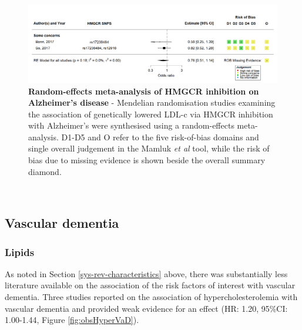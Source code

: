 \documentclass[a4paper, twoside]{templates/ociamthesis}
\begin{document}
\begin{figure}[H]
\includegraphics[width=1\linewidth]{figures/sys-rev/fp_MR_HMGCR_AD} \caption[Random-effects meta-analysis of HMGCR inhibition on Alzheimer's disease]{\textbf{Random-effects meta-analysis of HMGCR inhibition on Alzheimer's disease} - Mendelian randomisation studies examining the association of genetically lowered LDL-c via HMGCR inhibition with Alzheimer's were synthesised using a random-effects meta-analysis. D1-D5 and O refer to the five risk-of-bias domains and single overall judgement in the Mamluk \emph{et al} tool, while the risk of bias due to missing evidence is shown beside the overall summary diamond.}\label{fig:mrStatinADFig}
\end{figure}

~

\hypertarget{sys-rev-res-VaD}{%
\subsection{Vascular dementia}\label{sys-rev-res-VaD}}

\hypertarget{lipids-2}{%
\subsubsection{Lipids}\label{lipids-2}}

As noted in Section \ref{sys-rev-characteristics} above, there was substantially less literature available on the association of the risk factors of interest with vascular dementia. Three studies reported on the association of hypercholesterolemia with vascular dementia and provided weak evidence for an effect (HR: 1.20, 95\%CI: 1.00-1.44, Figure \ref{fig:obsHyperVaD}).
\end{document}
